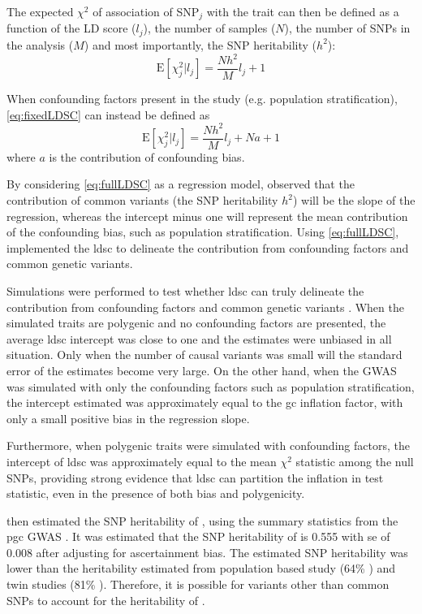 	The expected $\chi^2$ of association of \gls{SNP}$_j$ with the trait can then be defined as a function of the \gls{LD} score ($l_j$), the number of samples ($N$), the number of \glspl{SNP} in the analysis ($M$) and most importantly, the \gls{SNP} heritability ($h^2$):
	\begin{equation}
	\mathrm{E}[\chi^2_j | l_j] = \frac{Nh^2}{M}l_j+1
	\label{eq:fixedLDSC}
	\end{equation}
	
	When confounding factors present in the study (e.g. population stratification), \cref{eq:fixedLDSC} can instead be defined as
	\begin{equation}
	\mathrm{E}[\chi^2_j | l_j] = \frac{Nh^2}{M}l_j+Na+1
	\label{eq:fullLDSC}
	\end{equation}
	where $a$ is the contribution of confounding bias.
	
	By considering \cref{eq:fullLDSC} as a regression model, \citet{Bulik-Sullivan2015} observed that the contribution of common variants (the \gls{SNP} heritability $h^2$) will be the slope of the regression, whereas the intercept minus one will represent the mean contribution of the confounding bias, such as population stratification. 
	Using \cref{eq:fullLDSC}, \citet{Bulik-Sullivan2015} implemented the \gls{ldsc} to delineate the contribution from confounding factors and common genetic variants.
	
	Simulations were performed to test whether \gls{ldsc} can truly delineate the contribution from confounding factors and common genetic variants \citep{Bulik-Sullivan2015}.
	When the simulated traits are polygenic and no confounding factors are presented, the average \gls{ldsc} intercept was close to one and the estimates were unbiased in all situation.
	Only when the number of causal variants was small will the standard error of the estimates become very large.
	On the other hand, when the \gls{GWAS} was simulated with only the confounding factors such as population stratification, the intercept estimated was approximately equal to the \gls{gc} inflation factor, with only a small positive bias in the regression slope.
	
	Furthermore, when polygenic traits were simulated with confounding factors, the intercept of \gls{ldsc} was approximately equal to the mean $\chi^2$ statistic among the null \glspl{SNP}, providing strong evidence that \gls{ldsc} can partition the inflation in test statistic, even in the presence of both bias and polygenicity.
	
	\citet{Bulik-Sullivan2015} then estimated the \gls{SNP} heritability of , using the summary statistics from the \gls{pgc}  \gls{GWAS} \citep{Ripke2014}.
	It was estimated that the \gls{SNP} heritability of  is 0.555 with \gls{se} of 0.008 after adjusting for ascertainment bias.
	The estimated \gls{SNP} heritability was lower than the heritability estimated from population based study (64\% \citep{Lichtenstein2009}) and twin studies (81\% \citep{Sullivan2003}).
	Therefore, it is possible for variants other than common \glspl{SNP} to account for the heritability of .
	
